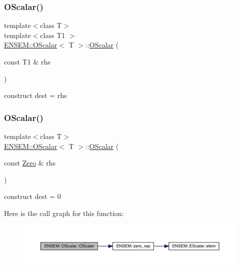 \subsubsection{\texorpdfstring{OScalar()}{OScalar()}\hspace{0.1cm}{\footnotesize\ttfamily [16/18]}}
{\footnotesize\ttfamily template$<$class T$>$ \\
template$<$class T1 $>$ \\
\mbox{\hyperlink{classENSEM_1_1OScalar}{E\+N\+S\+E\+M\+::\+O\+Scalar}}$<$ T $>$\+::\mbox{\hyperlink{classENSEM_1_1OScalar}{O\+Scalar}} (\begin{DoxyParamCaption}\item[{const T1 \&}]{rhs }\end{DoxyParamCaption})\hspace{0.3cm}{\ttfamily [inline]}}



construct dest = rhs 

\mbox{\label{classENSEM_1_1OScalar_a9bc3830b1a4af2e67da73871396ae06c}} 
\subsubsection{\texorpdfstring{OScalar()}{OScalar()}\hspace{0.1cm}{\footnotesize\ttfamily [17/18]}}
{\footnotesize\ttfamily template$<$class T$>$ \\
\mbox{\hyperlink{classENSEM_1_1OScalar}{E\+N\+S\+E\+M\+::\+O\+Scalar}}$<$ T $>$\+::\mbox{\hyperlink{classENSEM_1_1OScalar}{O\+Scalar}} (\begin{DoxyParamCaption}\item[{const \mbox{\hyperlink{structENSEM_1_1Zero}{Zero}} \&}]{rhs }\end{DoxyParamCaption})\hspace{0.3cm}{\ttfamily [inline]}}



construct dest = 0 

Here is the call graph for this function\+:
\nopagebreak
\begin{figure}[H]
\begin{center}
\leavevmode
\includegraphics[width=350pt]{da/d80/classENSEM_1_1OScalar_a9bc3830b1a4af2e67da73871396ae06c_cgraph}
\end{center}
\end{figure}
\mbox{\label{classENSEM_1_1OScalar_a4e394f0291247b014b9b75354e79ae6a}} 
